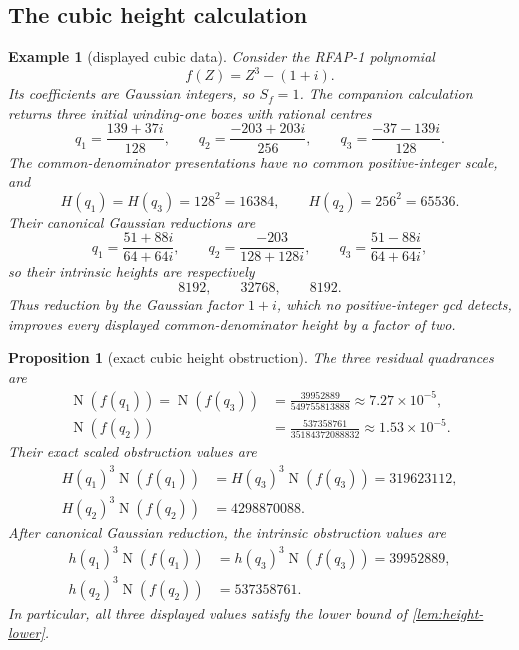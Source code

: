 \documentclass[11pt]{article}
\newtheorem{proposition}[proposition]{Proposition}
\newtheorem{example}[example]{Example}
\newcommand{\Norm}[1]{\operatorname{N}\!\left(#1\right)}
\begin{document}
\subsection{The cubic height calculation}

\begin{example}[displayed cubic data]
\label{ex:cubic-data}
Consider the RFAP-1 polynomial
\[
                         f(Z)=Z^3-(1+i).
\]
Its coefficients are Gaussian integers, so $S_f=1$.  The companion
calculation returns three initial winding-one boxes with rational centres
\[
 q_1=\frac{139+37i}{128},\qquad
 q_2=\frac{-203+203i}{256},\qquad
 q_3=\frac{-37-139i}{128}.
\]
The common-denominator presentations have no common positive-integer scale,
and
\[
 H(q_1)=H(q_3)=128^2=16384,
 \qquad H(q_2)=256^2=65536.
\]
Their canonical Gaussian reductions are
\[
 q_1=\frac{51+88i}{64+64i},\qquad
 q_2=\frac{-203}{128+128i},\qquad
 q_3=\frac{51-88i}{64+64i},
\]
so their intrinsic heights are respectively
\[
                     8192,\qquad32768,\qquad8192.
\]
Thus reduction by the Gaussian factor $1+i$, which no positive-integer gcd
detects, improves every displayed common-denominator height by a factor of
two.
\end{example}

\begin{proposition}[exact cubic height obstruction]
\label{prop:cubic-obstruction}
The three residual quadrances are
\begin{align*}
 \Norm{f(q_1)}=\Norm{f(q_3)}
   &=\frac{39952889}{549755813888}
     \approx 7.27\mathbin{\times}10^{-5},\\
 \Norm{f(q_2)}
   &=\frac{537358761}{35184372088832}
     \approx 1.53\mathbin{\times}10^{-5}.
\end{align*}
Their exact scaled obstruction values are
\[
 \begin{aligned}
 H(q_1)^3\Norm{f(q_1)}
   &=H(q_3)^3\Norm{f(q_3)}=319623112,\\
 H(q_2)^3\Norm{f(q_2)}&=4298870088.
 \end{aligned}
\]
After canonical Gaussian reduction, the intrinsic obstruction values are
\[
 \begin{aligned}
 h(q_1)^3\Norm{f(q_1)}
   &=h(q_3)^3\Norm{f(q_3)}=39952889,\\
 h(q_2)^3\Norm{f(q_2)}&=537358761.
 \end{aligned}
\]
In particular, all three displayed values satisfy the lower bound of
\cref{lem:height-lower}.
\end{proposition}
\end{document}
